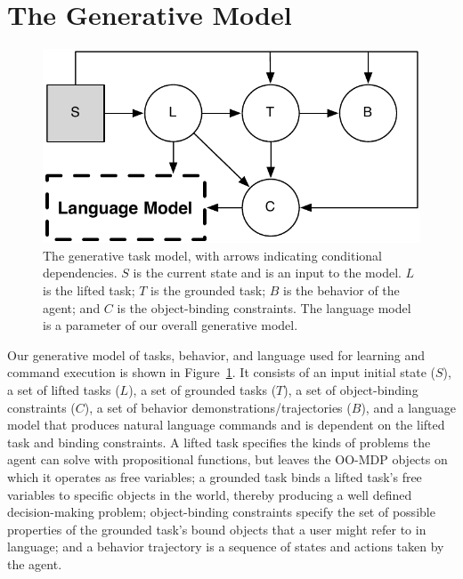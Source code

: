 \documentclass[conference]{IEEEtran}
\begin{document}
\section{The Generative Model}
\begin{figure}[tbp]
\begin{center}
\includegraphics[width=.7\columnwidth]{images/taskModel}
\caption{\small The generative task model, with arrows indicating conditional dependencies. $S$ is the current state and is an input to the model. $L$ is the lifted task; $T$ is the grounded task; $B$ is the behavior of the agent; and $C$ is the object-binding constraints. The language model is a parameter of our overall generative model.}
\label{fig:tm}
\end{center}
\end{figure}
Our generative model of tasks, behavior, and language used for learning and command execution is shown in Figure~\ref{fig:tm}. It consists of an input initial state ($S$), a set of lifted tasks ($L$), a set of grounded tasks ($T$), a set of object-binding constraints ($C$), a set of behavior demonstrations/trajectories ($B$), and a language model that produces natural language commands and is dependent on the lifted task and binding constraints. A lifted task specifies the kinds of problems the agent can solve with propositional functions, but leaves the OO-MDP objects on which it operates as free variables; a grounded task binds a lifted task's free variables to specific objects in the world, thereby producing a well defined decision-making problem; object-binding constraints specify the set of possible properties of the grounded task's bound objects that a user might refer to in language; and a behavior trajectory is a sequence of states and actions taken by the agent. 
\end{document}
